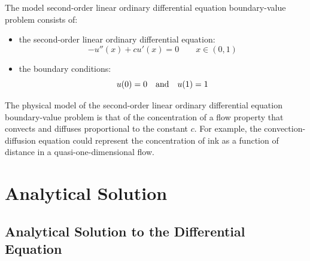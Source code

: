 \documentclass[10pt, reqno]{article}		%
\numberwithin{equation}{section}
\begin{document}
The model second-order linear ordinary differential equation boundary-value problem consists of:
\begin{itemize}
	\item the second-order linear ordinary differential equation:
	\begin{equation}
	- u''(x)+cu'(x)=0 \qquad x \in (0, 1)
	\end{equation}
	\item the boundary conditions:
	\begin{equation}
	u(0) = 0 \quad \textnormal{and} \quad u(1) = 1 
	\end{equation}
\end{itemize}
The physical model of the second-order linear ordinary differential equation boundary-value problem is that of the concentration of a flow property that convects and diffuses proportional to the constant $c$. For example, the convection-diffusion equation could represent the concentration of ink as a function of distance in a quasi-one-dimensional flow.

\newpage

\section{Analytical Solution}

\subsection{Analytical Solution to the Differential Equation}
\end{document}
